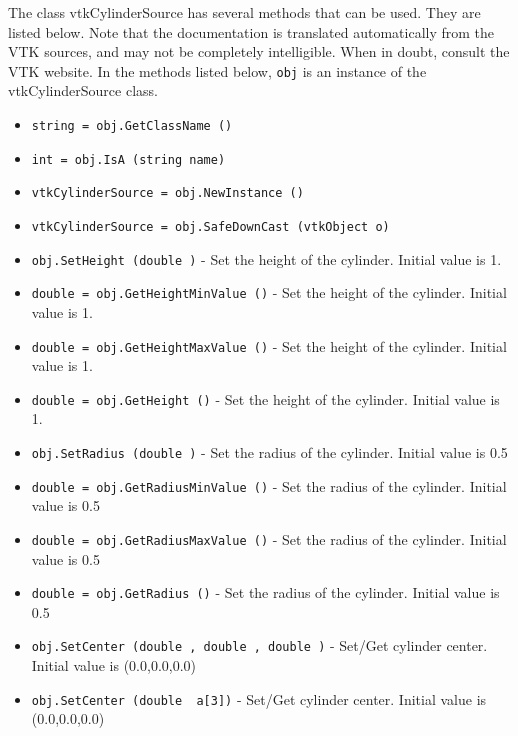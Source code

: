 The class vtkCylinderSource has several methods that can be used.
  They are listed below.
Note that the documentation is translated automatically from the VTK sources,
and may not be completely intelligible.  When in doubt, consult the VTK website.
In the methods listed below, \verb|obj| is an instance of the vtkCylinderSource class.
\begin{itemize}
\item  \verb|string = obj.GetClassName ()|

\item  \verb|int = obj.IsA (string name)|

\item  \verb|vtkCylinderSource = obj.NewInstance ()|

\item  \verb|vtkCylinderSource = obj.SafeDownCast (vtkObject o)|

\item  \verb|obj.SetHeight (double )| -  Set the height of the cylinder. Initial value is 1.

\item  \verb|double = obj.GetHeightMinValue ()| -  Set the height of the cylinder. Initial value is 1.

\item  \verb|double = obj.GetHeightMaxValue ()| -  Set the height of the cylinder. Initial value is 1.

\item  \verb|double = obj.GetHeight ()| -  Set the height of the cylinder. Initial value is 1.

\item  \verb|obj.SetRadius (double )| -  Set the radius of the cylinder. Initial value is 0.5

\item  \verb|double = obj.GetRadiusMinValue ()| -  Set the radius of the cylinder. Initial value is 0.5

\item  \verb|double = obj.GetRadiusMaxValue ()| -  Set the radius of the cylinder. Initial value is 0.5

\item  \verb|double = obj.GetRadius ()| -  Set the radius of the cylinder. Initial value is 0.5

\item  \verb|obj.SetCenter (double , double , double )| -  Set/Get cylinder center. Initial value is (0.0,0.0,0.0)

\item  \verb|obj.SetCenter (double  a[3])| -  Set/Get cylinder center. Initial value is (0.0,0.0,0.0)


\end{itemize}
